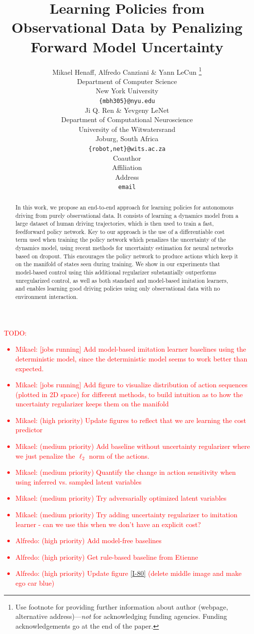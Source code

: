 \documentclass{article} %
\title{Learning Policies from Observational Data by Penalizing Forward Model Uncertainty}
\author{Mikael Henaff, Alfredo Canziani \& Yann LeCun \thanks{ Use footnote for providing further information
about author (webpage, alternative address)---\emph{not} for acknowledging
funding agencies.  Funding acknowledgements go at the end of the paper.} \\
Department of Computer Science\\
New York University\\
\texttt{\{mbh305\}@nyu.edu} \\
\And
Ji Q. Ren \& Yevgeny LeNet \\
Department of Computational Neuroscience \\
University of the Witwatersrand \\
Joburg, South Africa \\
\texttt{\{robot,net\}@wits.ac.za} \\
\AND
Coauthor \\
Affiliation \\
Address \\
\texttt{email}
}
\begin{document}
\maketitle

\begin{abstract}
  In this work, we propose an end-to-end approach for learning policies for autonomous driving from purely observational data.
  It consists of learning a dynamics model from a large dataset of human driving trajectories, which is then used to train a fast, feedforward policy network.
  Key to our approach is the use of a differentiable cost term used when training the policy network which penalizes the uncertainty of the dynamics model, using recent methods for uncertainty estimation for neural networks based on dropout.
  This encourages the policy network to produce actions which keep it on the manifold of states seen during training. 
We show in our experiments that model-based control using this additional regularizer substantially outperforms unregularized control, as well as both standard and model-based imitation learners, and enables learning good driving policies using only observational data with no environment interaction.
\end{abstract}



\textcolor{red}{
  TODO:
  \begin{itemize}
  \item Mikael: [jobs running] Add model-based imitation learner baselines using the deterministic model, since the deterministic model seems to work better than expected.
  \item Mikael: [jobs running] Add figure to visualize distribution of action sequences (plotted in 2D space) for different methods, to build intuition as to how the uncertainty regularizer keeps them on the manifold
  \item Mikael: (high priority) Update figures to reflect that we are learning the cost predictor
  \item Mikael: (medium priority) Add baseline without uncertainty regularizer where we just penalize the $\ell_2$ norm of the actions.
  \item Mikael: (medium priority) Quantify the change in action sensitivity when using inferred vs. sampled latent variables
  \item Mikael: (medium priority) Try adversarially optimized latent variables
  \item Mikael: (medium priority) Try adding uncertainty regularizer to imitation learner - can we use this when we don't have an explicit cost?
  \item Alfredo: (high priority) Add model-free baselines
  \item Alfredo: (high priority) Get rule-based baseline from Etienne
  \item Alfredo: (high priority) Update figure \ref{I-80} (delete middle image and make ego car blue)
  \end{itemize}
  }
\end{document}
